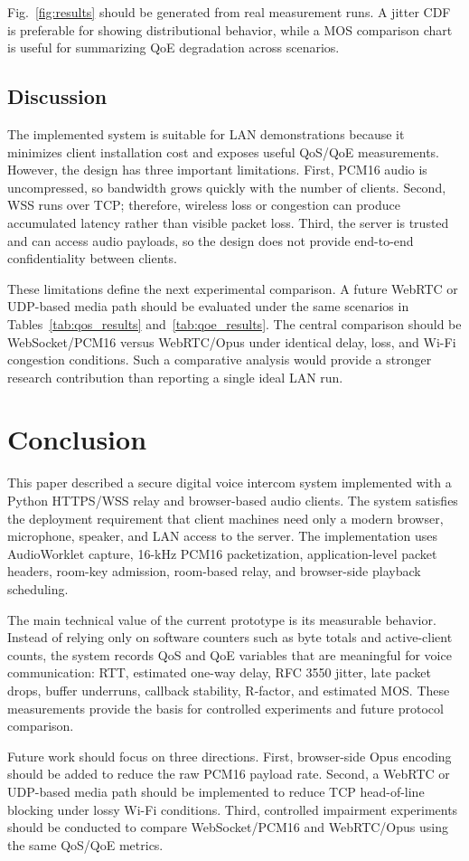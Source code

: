 \documentclass[conference]{IEEEtran}
\begin{document}
Fig.~\ref{fig:results} should be generated from real measurement runs. A jitter CDF is preferable for showing distributional behavior, while a MOS comparison chart is useful for summarizing QoE degradation across scenarios.

\subsection{Discussion}

The implemented system is suitable for LAN demonstrations because it minimizes client installation cost and exposes useful QoS/QoE measurements. However, the design has three important limitations. First, PCM16 audio is uncompressed, so bandwidth grows quickly with the number of clients. Second, WSS runs over TCP; therefore, wireless loss or congestion can produce accumulated latency rather than visible packet loss. Third, the server is trusted and can access audio payloads, so the design does not provide end-to-end confidentiality between clients.

These limitations define the next experimental comparison. A future WebRTC or UDP-based media path should be evaluated under the same scenarios in Tables~\ref{tab:qos_results} and~\ref{tab:qoe_results}. The central comparison should be WebSocket/PCM16 versus WebRTC/Opus under identical delay, loss, and Wi-Fi congestion conditions. Such a comparative analysis would provide a stronger research contribution than reporting a single ideal LAN run.

\section{Conclusion}

This paper described a secure digital voice intercom system implemented with a Python HTTPS/WSS relay and browser-based audio clients. The system satisfies the deployment requirement that client machines need only a modern browser, microphone, speaker, and LAN access to the server. The implementation uses AudioWorklet capture, 16-kHz PCM16 packetization, application-level packet headers, room-key admission, room-based relay, and browser-side playback scheduling.

The main technical value of the current prototype is its measurable behavior. Instead of relying only on software counters such as byte totals and active-client counts, the system records QoS and QoE variables that are meaningful for voice communication: RTT, estimated one-way delay, RFC 3550 jitter, late packet drops, buffer underruns, callback stability, R-factor, and estimated MOS. These measurements provide the basis for controlled experiments and future protocol comparison.

Future work should focus on three directions. First, browser-side Opus encoding should be added to reduce the raw PCM16 payload rate. Second, a WebRTC or UDP-based media path should be implemented to reduce TCP head-of-line blocking under lossy Wi-Fi conditions. Third, controlled impairment experiments should be conducted to compare WebSocket/PCM16 and WebRTC/Opus using the same QoS/QoE metrics.



\end{document}

